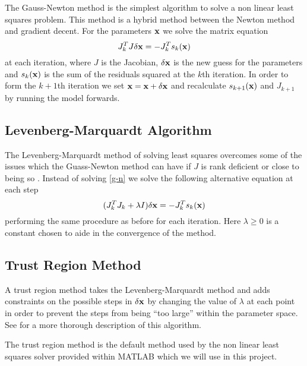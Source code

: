 The Gauss-Newton method is the simplest algorithm to solve a non linear least squares problem. This
method is a hybrid method between the Newton method and gradient decent. For the parameters $\mathbf{x}$ we
solve the matrix equation
\begin{equation} \label{g-n}
J_k^{T} J \delta \mathbf{x} = - J_{k}^{T} s_k(\mathbf{x})
\end{equation}
at each iteration, where $J$ is the Jacobian, $\delta \mathbf{x}$ is the new guess for the parameters and $s_k(\mathbf{x})$ is the sum
of the residuals squared at the $k$th iteration. In order to form the $k+1$th iteration we set $\mathbf{x} = \mathbf{x} + \delta \mathbf{x}$
and recalculate $s_{k+1}(\mathbf{x})$ and $J_{k+1}$ by running the model forwards.

\subsection{Levenberg-Marquardt Algorithm}

The Levenberg-Marquardt method of solving least squares overcomes some of the issues which the Guass-Newton
method can have if $J$ is rank deficient or close to being so \citet{Nocedal}. Instead of solving
\eqref{g-n} we solve the following alternative equation at each step
\begin{equation}
(J_{k}^T J_k + \lambda I)\delta \mathbf{x} = - J_{k}^{T} s_k(\mathbf{x})
\end{equation}
performing the same procedure as before for each iteration. Here $\lambda \geq 0$ is a constant chosen to
aide in the convergence of the method.

\subsection{Trust Region Method}

A trust region method takes the Levenberg-Marquardt method and adds constraints on the possible steps
in $\delta \mathbf{x}$ by changing the value of $\lambda$ at each point in order to prevent the steps from being
``too large'' within the parameter space. See \citet{kelley1999iterative} for a more thorough description
of this algorithm.

The trust region method is the default method used by the non linear least squares solver provided
within MATLAB which we will use in this project.